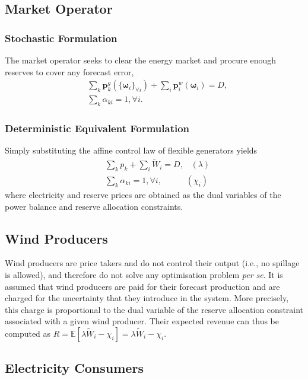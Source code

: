\documentclass{article}
\begin{document}
\subsection{Market Operator}

\subsubsection{Stochastic Formulation}

The market operator seeks to clear the energy market and procure enough reserves to cover any forecast error,
\begin{align}
& \sum_k \mathbf{p}_k^g(\{\boldsymbol{\omega}_i\}_{\forall i}) + \sum_i \mathbf{p}_i^w(\boldsymbol{\omega}_i) = D,\\
& \sum_{k} \alpha_{ki} = 1, \forall i.
\end{align}

\subsubsection{Deterministic Equivalent Formulation}

Simply substituting the affine control law of flexible generators yields
\begin{align}
& \sum_k p_k + \sum_i \tilde{W}_i = D, \hspace{10pt} (\lambda)\\
& \sum_k \alpha_{ki} = 1, \forall i, \hspace{35pt} (\chi_i)
\end{align}
where electricity and reserve prices are obtained as the dual variables of the power balance and reserve allocation constraints.
\subsection{Wind Producers}

Wind producers are price takers and do not control their output (i.e., no spillage is allowed), and therefore do not solve any optimisation problem \textit{per se}. It is assumed that wind producers are paid for their forecast production and are charged for the uncertainty that they introduce in the system. More precisely, this charge is proportional to the dual variable of the reserve allocation constraint associated with a given wind producer. Their expected revenue can thus be computed as $R = \mathbb{E}[\lambda \tilde{W}_i - \chi_i] = \lambda \tilde{W}_i - \chi_i$.

\subsection{Electricity Consumers}
\end{document}
